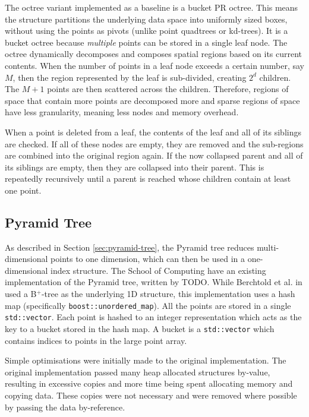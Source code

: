 The octree variant implemented as a baseline is a bucket PR octree. This means the structure partitions the underlying data space into uniformly sized boxes, without using the points as pivots (unlike point quadtrees or kd-trees). It is a bucket octree because \textit{multiple} points can be stored in a single leaf node. The octree dynamically decomposes and composes spatial regions based on its current contents. When the number of points in a leaf node exceeds a certain number, say $M$, then the region represented by the leaf is sub-divided, creating $2^d$ children. The $M + 1$ points are then scattered across the children. Therefore, regions of space that contain more points are decomposed more and sparse regions of space have less granularity, meaning less nodes and memory overhead.

When a point is deleted from a leaf, the contents of the leaf and all of its siblings are checked. If all of these nodes are empty, they are removed and the sub-regions are combined into the original region again. If the now collapsed parent and all of its siblings are empty, then they are collapsed into their parent. This is repeatedly recursively until a parent is reached whose children contain at least one point.

\subsection{Pyramid Tree}

As described in Section \ref{sec:pyramid-tree}, the Pyramid tree reduces multi-dimensional points to one dimension, which can then be used in a one-dimensional index structure. The School of Computing have an existing implementation of the Pyramid tree, written by TODO. While Berchtold et al. in \cite{pyramid-tree} used a B${}^{+}$-tree as the underlying 1D structure, this implementation uses a hash map (specifically \texttt{boost::unordered\_map}). All the points are stored in a single \texttt{std::vector}. Each point is hashed to an integer representation which acts as the key to a bucket stored in the hash map. A bucket is
 a \texttt{std::vector} which contains indices to points in the large point array.
 
Simple optimisations were initially made to the original implementation. The original implementation passed many heap allocated structures by-value, resulting in excessive copies and more time being spent allocating memory and copying data. These copies were not necessary and were removed where possible by passing the data by-reference.

